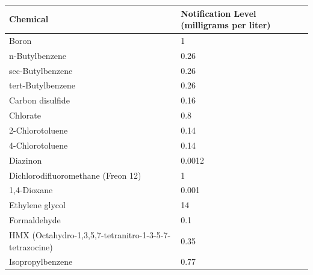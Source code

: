 \begin{table}[]
\begin{tabular}{|l|l|}
\hline
Chemical                                                    & Notification   Level   (milligrams   per liter) \\ \hline
Boron                                                       & 1                                               \\ \hline
n-Butylbenzene                                              & 0.26                                            \\ \hline
sec-Butylbenzene                                            & 0.26                                            \\ \hline
tert-Butylbenzene                                           & 0.26                                            \\ \hline
Carbon   disulfide                                          & 0.16                                            \\ \hline
Chlorate                                                    & 0.8                                             \\ \hline
2-Chlorotoluene                                             & 0.14                                            \\ \hline
4-Chlorotoluene                                             & 0.14                                            \\ \hline
Diazinon                                                    & 0.0012                                          \\ \hline
Dichlorodifluoromethane   (Freon   12)                      & 1                                               \\ \hline
1,4-Dioxane                                                 & 0.001                                           \\ \hline
Ethylene   glycol                                           & 14                                              \\ \hline
Formaldehyde                                                & 0.1                                             \\ \hline
HMX   (Octahydro-1,3,5,7-tetranitro-1-3-5-7-   tetrazocine) & 0.35                                            \\ \hline
Isopropylbenzene                                            & 0.77                                            \\ \hline

\end{tabular}
\end{table}
